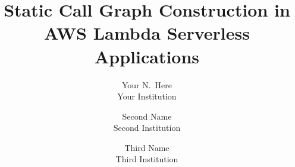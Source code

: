 %
%
%  
%

\documentclass[letterpaper,twocolumn,10pt]{article}
\usepackage{usenix2019_v3}



\date{}

\title{\Large \bf Static Call Graph Construction in AWS Lambda Serverless Applications}

\author{
{\rm Your N.\ Here}\\
Your Institution
\and
{\rm Second Name}\\
Second Institution
\and
{\rm Third Name}\\
Third Institution
} %

\maketitle

\begin{abstract}
 This paper describes an approach for statically constructing call graphs for applications that execute in a serverless cloud. We briefly introduce static analysis and explain the role of a call graph in performing such analyses, then discuss the benefits of using such an approach over existing dynamic techniques like those that employ program traces. We then explore the challenges associated with capturing complete program flows in a serverless environment, where state passes between lambda functions through event triggers associated with external data stores. To implement our discovered techniques we present \_\_\_\_\_, a tool for statically constructing call graphs on AWS Lambda applications written in Javascript.
\end{abstract}



